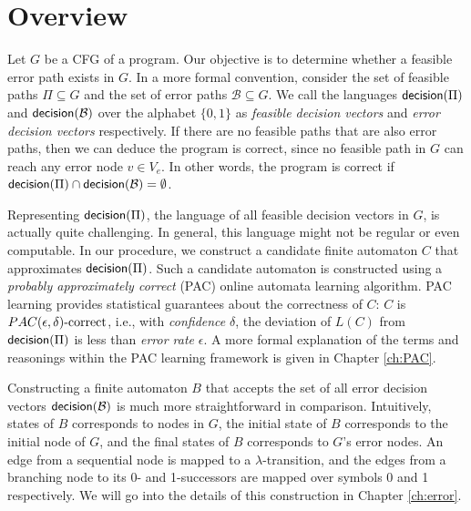 
\chapter{Overview}\label{ch:overview}

Let $G$ be a CFG of a program. Our objective is to determine whether a feasible error path exists in $G$. In a more formal convention, consider the set of feasible paths $\Pi \subseteq G$ and the set of error paths $\mathcal{B} \subseteq G$. We call the languages $\mathsf{decision}	(\Pi)$ and $\mathsf{decision}(\mathcal{B})$ over the alphabet $\{0,1\}$ as \emph{feasible decision vectors} and \emph{error decision vectors} respectively. If there are no feasible paths that are also error paths, then we can deduce the program is correct, since no feasible path in $G$ can reach any error node $v \in V_e$. In other words, the program is correct if $\mathsf{decision}(\Pi) \cap \mathsf{decision}(\mathcal{B}) = \emptyset$. 

Representing $\mathsf{decision}(\Pi)$, the language of all feasible decision vectors in $G$, is actually quite challenging. In general, this language might not be regular or even computable. In our procedure, we construct a candidate finite automaton $C$ that approximates $\mathsf{decision}(\Pi)$. Such a candidate automaton is constructed using a \emph{probably approximately correct} (PAC) online automata learning algorithm. PAC learning provides statistical guarantees about the correctness of $C$: $C$ is \emph{$PAC(\epsilon, \delta)\text{-correct}$}, i.e., with \emph{confidence} $\delta$, the deviation of $L(C)$ from $\mathsf{decision}(\Pi)$ is less than \emph{error rate} $\epsilon$. A more formal explanation of the terms and reasonings within the PAC learning framework is given in Chapter \ref{ch:PAC}.

Constructing a finite automaton $B$ that accepts the set of all error decision vectors $\mathsf{decision}(\mathcal{B})$ is much more straightforward in comparison. Intuitively, states of $B$ corresponds to nodes in $G$, the initial state of $B$ corresponds to the initial node of $G$, and the final states of $B$ corresponds to $G$'s error nodes. An edge from a sequential node is mapped to a $\lambda$-transition, and the edges from a branching node to its 0- and 1-successors are mapped over symbols 0 and 1 respectively. We will go into the details of this construction in Chapter \ref{ch:error}.

